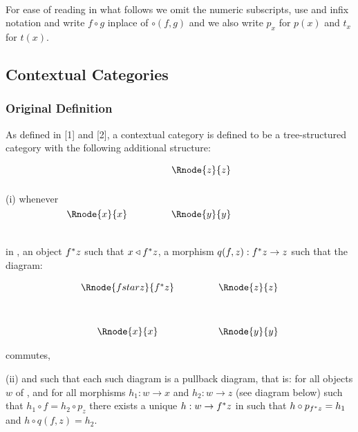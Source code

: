 \documentclass[10pt,a4paper]{scrartcl}
\begin{document}
\vspace{.05cm}  \\

\noindent
For ease of reading in what follows we omit the numeric subscripts, use and infix notation and write $f \circ g$ inplace of $\circ (f,g)$ 
and we also write $p_x$ for $p(x)$ and $t_x$ for $t(x)$.

\subsection{Contextual Categories}

\subsubsection{Original Definition}

As defined in [1] and [2], a contextual category is defined to be a tree-structured category 
 with the following additional structure:

\noindent 
(i) whenever
$
\begin{array}{cp{.9cm}c}
            & & \Rnode{z}{z} \\ [1.2cm]
\Rnode{x}{x}& & \Rnode{y}{y} \\ [0.5cm]
\end{array}
$

in , an object $f ^* z$ such that $x \triangleleft f ^* z$, a morphism $q(f,z): f ^* z \rightarrow z$ such that the diagram:

\vspace{3mm}
\begin{center}
\begin{displaymath}
\begin{array}{cp{.9cm}c}
\Rnode{fstarz}{f^*z} & & \Rnode{z}{z}\\ [1.2cm]
\Rnode{x}{x}         & & \Rnode{y}{y}
\end{array}
\end{displaymath}
\end{center}
commutes, 

\noindent
(ii) and such that each such diagram is a pullback diagram, that is: for all objects $w$ of , and for all
morphisms $h_1: w \rightarrow x$ and $h_2: w \rightarrow z$ (see diagram below) such that
$h_1 \circ f = h_2 \circ p_z$ 
there exists a unique $h:w \rightarrow f ^* z$ in  such that
$h \circ p_{f ^* z} = h_1$ and $h \circ q(f,z) = h_2$.
\end{document}
